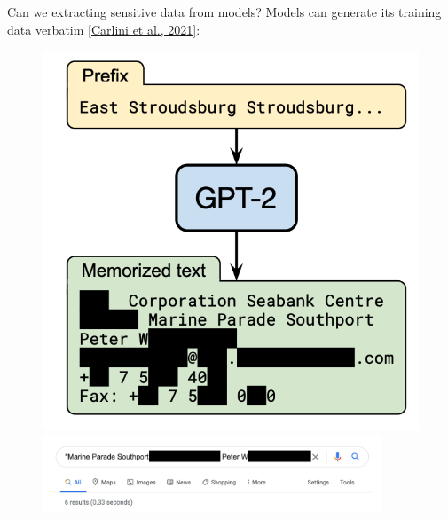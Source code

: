 \documentclass[usenames,dvipsnames,notes,11pt,aspectratio=169,hyperref={colorlinks=true, linkcolor=blue}]{beamer}
\begin{document}
\begin{frame}
    {Can we extracting sensitive data from models?}
    Models can generate its training data verbatim \href{https://arxiv.org/pdf/2012.07805.pdf}{[Carlini et al., 2021]}:\vspace{-2em}
            \begin{figure}
            \includegraphics[height=0.5\textheight]{figures/mem-gpt2}
            \includegraphics[width=0.9\textwidth]{figures/peter}
            \end{figure}
\end{frame}
\end{document}
